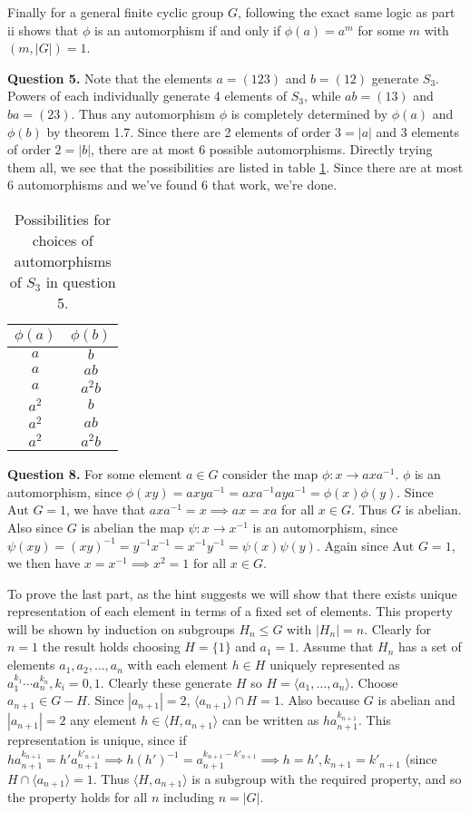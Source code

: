 \documentclass[letterpaper, reqno,11pt]{article}
\begin{document}
Finally for a general finite cyclic group $G$, following the exact same logic as part ii shows that $\phi$ is an automorphism if and only if $\phi(a)=a^{m}$ for some $m$ with $(m,|G|)=1$.

{\medskip\noindent\bf Question 5.} Note that the elements $a=(123)$ and $b=(12)$ generate $S_3$. Powers of each individually generate 4 elements of $S_3$, while $ab=(13)$ and $ba=(23)$. Thus any automorphism $\phi$ is completely determined by $\phi(a)$ and $\phi(b)$ by theorem 1.7. Since there are 2 elements of order $3=|a|$ and 3 elements of order $2=|b|$, there are at most 6 possible automorphisms. Directly trying them all, we see that the possibilities are listed in table \ref{tab:S3}. Since there are at most 6 automorphisms and we've found 6 that work, we're done.
\begin{table}[htpb]
    \centering
    \caption{Possibilities for choices of automorphisms of $S_3$ in question 5.}
    \label{tab:S3}
    \begin{tabular}{|c|c|}
        \hline
        $\phi(a)$&$\phi(b)$\\
        \hline
        $a$&$b$\\
        $a$&$ab$\\
        $a$&$a^2b$\\
        $a^2$&$b$\\
        $a^2$&$ab$\\
        $a^2$&$a^2b$\\
        \hline
    \end{tabular}
\end{table}

{\medskip\noindent\bf Question 8.} For some element $a\in G$ consider the map $\phi: x\to axa^{-1}$. $\phi$ is an automorphism, since $\phi(xy)=axya^{-1}=axa^{-1}aya^{-1}=\phi(x)\phi(y)$. Since $\text{Aut }G=1$, we have that $axa^{-1}=x\implies ax=xa$ for all $x\in G$. Thus $G$ is abelian. Also since $G$ is abelian the map $\psi: x\to x^{-1}$ is an automorphism, since $\psi(xy)=(xy)^{-1}=y^{-1}x^{-1}=x^{-1}y^{-1}=\psi(x)\psi(y)$. Again since $\text{Aut }G=1$, we then have $x=x^{-1}\implies x^2=1$ for all $x\in G$.

To prove the last part, as the hint suggests we will show that there exists unique representation of each element in terms of a fixed set of elements. This property will be shown by induction on subgroups $H_n\leq G$ with $|H_n|=n$. Clearly for $n=1$ the result holds choosing $H=\{1\}$ and $a_1=1$. Assume that $H_n$ has a set of elements $a_1,a_2,\ldots, a_n$ with each element $h\in H$ uniquely represented as $a_1^{k_1}\cdots a_n^{k_n},k_i=0,1$. Clearly these generate $H$ so $H=\langle a_1,\ldots,a_n\rangle$. Choose $a_{n+1}\in G-H$. Since $|a_{n+1}|=2$, $\langle a_{n+1}\rangle\cap H=1$. Also because $G$ is abelian and $|a_{n+1}|=2$ any element $h\in\langle H,a_{n+1}\rangle$ can be written as $ha_{n+1}^{k_{n+1}}$. This representation is unique, since if $ha_{n+1}^{k_{n+1}}=h'a_{n+1}^{k'_{n+1}}\implies h(h')^{-1}=a_{n+1}^{k_{n+1}-k'_{n+1}}\implies h=h',k_{n+1}=k'_{n+1}$ (since $H\cap \langle a_{n+1}\rangle=1$. Thus $\langle H,a_{n+1}\rangle$ is a subgroup with the required property, and so the property holds for all $n$ including $n=|G|$.
\end{document}
